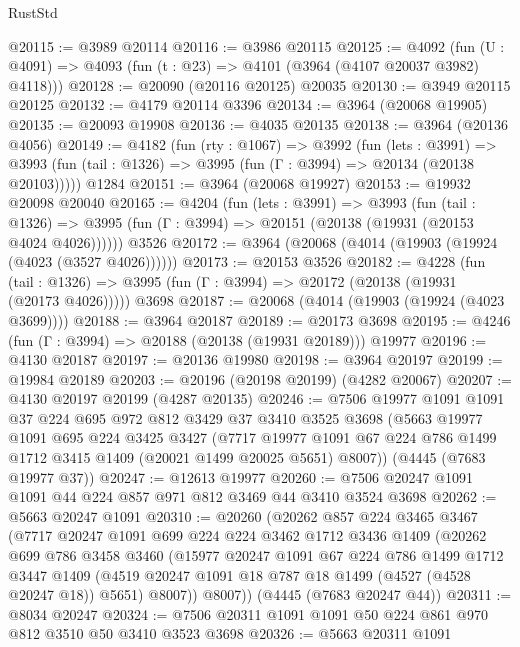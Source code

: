 \begin{lexlean}{RustStd}
\begin{coremodule}
@20115 := @3989 @20114
@20116 := @3986 @20115
@20125 := @4092
    (fun (U : @4091) => @4093 (fun (t : @23) => @4101 (@3964 (@4107 @20037 @3982) @4118)))
@20128 := @20090 (@20116 @20125) @20035
@20130 := @3949 @20115 @20125
@20132 := @4179 @20114 @3396
@20134 := @3964 (@20068 @19905)
@20135 := @20093 @19908
@20136 := @4035 @20135
@20138 := @3964 (@20136 @4056)
@20149 := @4182
    (fun (rty : @1067) =>
    @3992
      (fun (lets : @3991) =>
      @3993 (fun (tail : @1326) => @3995 (fun (Γ : @3994) => @20134 (@20138 @20103)))))
    @1284
@20151 := @3964 (@20068 @19927)
@20153 := @19932 @20098 @20040
@20165 := @4204
    (fun (lets : @3991) =>
    @3993
      (fun (tail : @1326) =>
      @3995 (fun (Γ : @3994) => @20151 (@20138 (@19931 (@20153 @4024 @4026))))))
    @3526
@20172 := @3964 (@20068 (@4014 (@19903 (@19924 (@4023 (@3527 @4026))))))
@20173 := @20153 @3526
@20182 := @4228
    (fun (tail : @1326) => @3995 (fun (Γ : @3994) => @20172 (@20138 (@19931 (@20173 @4026)))))
    @3698
@20187 := @20068 (@4014 (@19903 (@19924 (@4023 @3699))))
@20188 := @3964 @20187
@20189 := @20173 @3698
@20195 := @4246 (fun (Γ : @3994) => @20188 (@20138 (@19931 @20189))) @19977
@20196 := @4130 @20187
@20197 := @20136 @19980
@20198 := @3964 @20197
@20199 := @19984 @20189
@20203 := @20196 (@20198 @20199) (@4282 @20067)
@20207 := @4130 @20197 @20199 (@4287 @20135)
@20246 := @7506
    @19977
    @1091
    @1091
    @37
    @224
    @695
    @972
    @812
    @3429
    @37
    @3410
    @3525
    @3698
    (@5663
      @19977
      @1091
      @695
      @224
      @3425
      @3427
      (@7717 @19977 @1091 @67 @224 @786 @1499 @1712 @3415 @1409 (@20021 @1499 @20025 @5651) @8007))
    (@4445 (@7683 @19977 @37))
@20247 := @12613 @19977
@20260 := @7506 @20247 @1091 @1091 @44 @224 @857 @971 @812 @3469 @44 @3410 @3524 @3698
@20262 := @5663 @20247 @1091
@20310 := @20260
    (@20262
      @857
      @224
      @3465
      @3467
      (@7717
        @20247
        @1091
        @699
        @224
        @224
        @3462
        @1712
        @3436
        @1409
        (@20262
          @699
          @786
          @3458
          @3460
          (@15977
            @20247
            @1091
            @67
            @224
            @786
            @1499
            @1712
            @3447
            @1409
            (@4519 @20247 @1091 @18 @787 @18 @1499 (@4527 (@4528 @20247 @18)) @5651)
            @8007))
        @8007))
    (@4445 (@7683 @20247 @44))
@20311 := @8034 @20247
@20324 := @7506 @20311 @1091 @1091 @50 @224 @861 @970 @812 @3510 @50 @3410 @3523 @3698
@20326 := @5663 @20311 @1091

\end{coremodule}
\end{lexlean}
